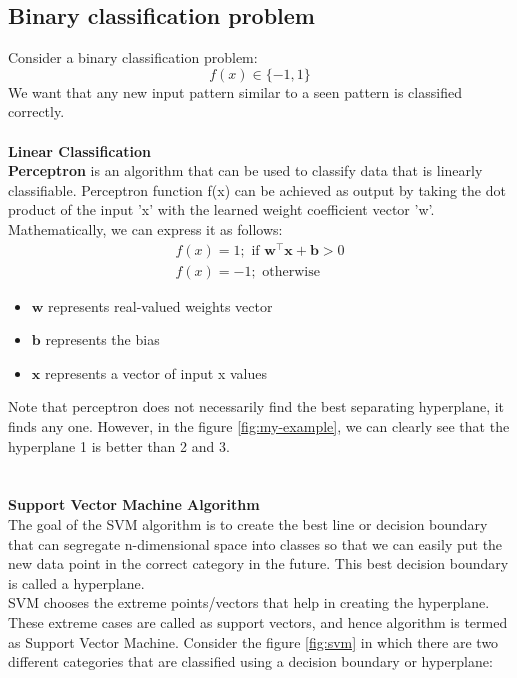 \documentclass[10pt]{article}
\begin{document}
\subsection{Binary classification problem}
Consider a binary classification problem:
\begin{equation*}
f(x) \in \{-1, 1\}
\end{equation*}
We want that any new input pattern similar to a seen pattern is classified correctly.\\\\
\textbf{Linear Classification}\\
\textbf{Perceptron} is an algorithm that can be used to classify data that is linearly classifiable.
Perceptron function f(x) can be achieved as output by taking the dot product of the input 'x' with the learned weight coefficient vector 'w'.\\
Mathematically, we can express it as follows:
\begin{gather*}
f(x) = 1; \text{ if     }  \mathbf{w}^\intercal \mathbf{x} + \mathbf{b} > 0\\
f(x)= -1; \text{ otherwise}
\end{gather*}
\begin{itemize}
\item $\mathbf{w}$ represents real-valued weights vector
\item $\mathbf{b}$ represents the bias
\item $\mathbf{x}$ represents a vector of input x values
\end{itemize}
\newpage
{}
\noindent Note that perceptron does not necessarily find the best separating hyperplane, it finds any one. However, in the figure \ref{fig:my-example}, we can clearly see that the hyperplane 1 is better than 2 and 3.
\\\\\\
\noindent
\textbf{Support Vector Machine Algorithm}\\
The goal of the SVM algorithm is to create the best line or decision boundary that can segregate n-dimensional space into classes so that we can easily put the new data point in the correct category in the future. This best decision boundary is called a hyperplane.\\
SVM chooses the extreme points/vectors that help in creating the hyperplane. These extreme cases are called as support vectors, and hence algorithm is termed as Support Vector Machine. Consider the figure \ref{fig:svm} in which there are two different categories that are classified using a decision boundary or hyperplane:
\end{document}
